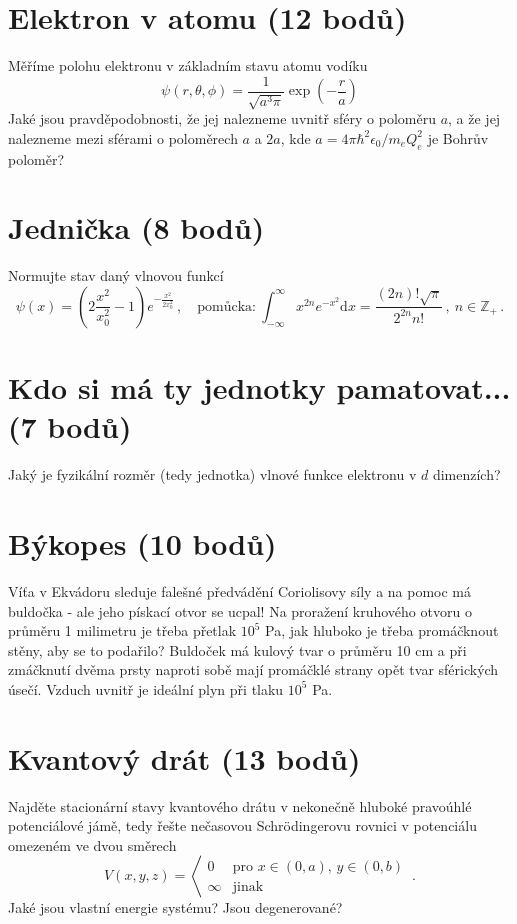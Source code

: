 \documentclass[10pt,a4paper,landscape]{article}
\begin{document}
\begin{multicols}{2}[]
\section{Elektron v atomu (12 bodů)}
Měříme polohu elektronu v základním stavu atomu vodíku
\begin{equation}
\psi\left(r, \theta, \phi\right) = \frac{1}{\sqrt{a^3\pi}}\exp\left(-\frac{r}{a}\right)
\end{equation}
Jaké jsou pravděpodobnosti, že jej nalezneme uvnitř sféry o poloměru $a$, a že jej nalezneme mezi sférami o poloměrech $a$ a $2a$, kde $a = 4\pi\hbar^2\epsilon_0/m_eQ_e^2$ je Bohrův poloměr?

\section{Jednička (8 bodů)}
Normujte stav daný vlnovou funkcí
\begin{equation}
\psi\left(x\right) = \left(2\frac{x^2}{x_0^2} - 1\right)e^{-\frac{x^2}{2x_0^2}} \,,\quad\text{pomůcka:}~\int_{-\infty}^\infty x^{2n}e^{-x^2}\mathrm{d}x = \frac{\left(2n\right)!\sqrt{\pi}}{2^{2n}n!}\,,~ n\in\mathbb{Z}_+ \,.
\end{equation}

\section{Kdo si má ty jednotky pamatovat... (7 bodů)}
Jaký je fyzikální rozměr (tedy jednotka) vlnové funkce elektronu v $d$ dimenzích?

\section{Býkopes (10 bodů)}
Víťa v Ekvádoru sleduje falešné předvádění Coriolisovy síly a na pomoc má buldočka - ale jeho pískací otvor se ucpal! Na proražení kruhového otvoru o průměru 1 milimetru je třeba přetlak $10^5$ Pa, jak hluboko je třeba promáčknout stěny, aby se to podařilo? Buldoček má kulový tvar o průměru 10 cm a při zmáčknutí dvěma prsty naproti sobě mají promáčklé strany opět tvar sférických úsečí. Vzduch uvnitř je ideální plyn při tlaku $10^5$ Pa.

\section{Kvantový drát (13 bodů)}
Najděte stacionární stavy kvantového drátu v nekonečně hluboké pravoúhlé potenciálové jámě, tedy řešte nečasovou Schr\"{o}dingerovu rovnici v potenciálu omezeném ve dvou směrech
\begin{equation}
V\left(x, y, z\right) = \left<\begin{matrix}0 & \text{pro } x\in\left(0, a\right),\,y\in\left(0, b\right) \\ \infty & \text{jinak}\end{matrix}\right.\,.
\end{equation}
Jaké jsou vlastní energie systému? Jsou degenerované?


\end{multicols}
\end{document}
